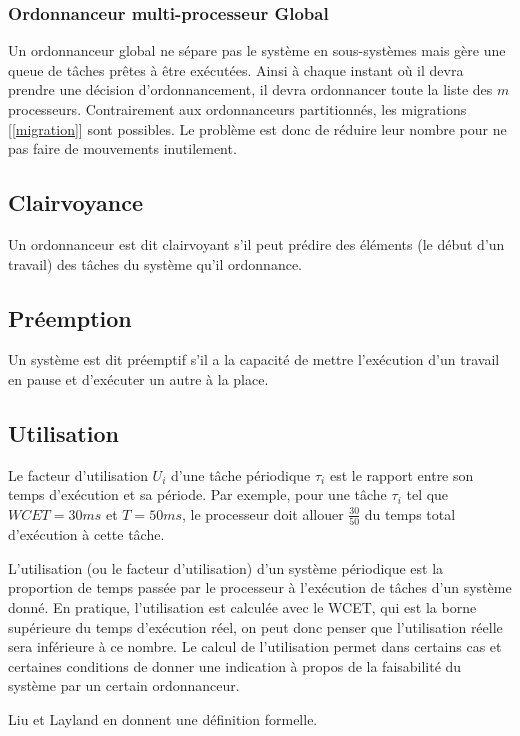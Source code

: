 	\subsubsection{Ordonnanceur multi-processeur Global}
	Un ordonnanceur global ne sépare pas le système en sous-systèmes mais gère une 
	queue de tâches prêtes à être exécutées. Ainsi à chaque instant où il devra prendre une décision 
	d'ordonnancement, il devra ordonnancer toute la liste des $m$ processeurs.\medskip
	Contrairement aux ordonnanceurs partitionnés, les migrations [\ref{migration}] sont possibles. Le problème 
	est donc de réduire leur nombre pour ne pas faire de mouvements inutilement.
	
	\subsection{Clairvoyance}\label{clairvoyance}
	Un ordonnanceur est dit \og clairvoyant\fg{}  s'il peut prédire des éléments (le début d'un travail) des tâches du système qu'il ordonnance.
	
	\subsection{Préemption}\label{preemption}
	Un système est dit préemptif s'il a la capacité 
	de mettre l'exécution d'un travail en pause et d'exécuter un autre à la place. 
	
	\subsection{Utilisation}\label{utilisation}
	Le facteur d'utilisation $U_i$ d'une tâche périodique $\tau_i$ est le rapport entre 
	son temps d'exécution et sa période. Par exemple, pour une tâche $\tau_i$ tel que 
	$WCET = 30 ms$ et $T = 50 ms$, le processeur doit allouer $\frac{30}{50}$ du temps 
	total d'exécution à cette tâche.\medskip
	
	L'utilisation (ou le facteur d'utilisation) d'un système périodique est la proportion de temps 
	passée par le processeur à l'exécution de tâches d'un système donné. En pratique, l'utilisation 
	est calculée avec le WCET, qui est la borne supérieure du temps d'exécution réel, on 
	peut donc penser que l'utilisation réelle sera inférieure à ce nombre.
	Le calcul de l'utilisation permet dans certains cas et certaines conditions de donner une indication 
	à propos de la faisabilité du système par un certain ordonnanceur. 
	\medskip
	
	Liu et Layland \cite{liu_scheduling_1973} en donnent une définition formelle.\medskip 
	
